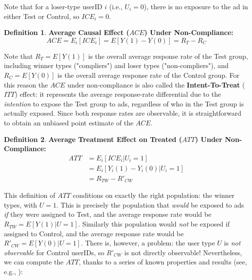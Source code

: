 \documentclass[11pt,a4paper]{article}
\theoremstyle{definition}
\newtheorem{definition}{Definition}[section]
\theoremstyle{remark}
\theoremstyle{definition}
\theoremstyle{definition}
\theoremstyle{definition}
\theoremstyle{definition}
\theoremstyle{definition}
\theoremstyle{definition}
\begin{document}
Note that for a loser-type userID $i$ (i.e., $U_i = 0$), there is no exposure to the ad in either Test or Control, so $ICE_i = 0$.

\begin{definition}\label{def-ace-noncomp}\small
	\textbf{Average Causal Effect ($ACE$) Under Non-Compliance:}
\begin{equation}
ACE = E_i[ICE_i] = E[ Y(1) - Y(0) ] = R_T - R_C \label{eq-ace-noncomp}	
\end{equation}
\end{definition}

Note that $R_T = E[ Y(1)]$ is the overall average response rate of the Test group, including winner types ("compliers") and loser types ("non-compliers"), and $R_C = E[Y(0)]$ is the overall average response rate of the Control group. For this reason the $ACE$ under non-compliance is also called the \textbf{Intent-To-Treat} ($ITT$) effect: it represents the average response-rate differential due to the \textit{intention} to expose the Test group to ads, regardless of who in the Test group is actually exposed. Since both response rates are observable, it is straightforward to obtain an unbiased point estimate of the $ACE$.

\begin{definition}\label{def-att-noncomp}\small
	\textbf{Average Treatment Effect on Treated ($ATT$) Under Non-Compliance:}
\begin{align}
ATT & =  E_i[ ICE_i | U_i = 1]   \nonumber \\
    & =  E_i [Y_i(1) - Y_i(0) | U_i = 1] 	\nonumber \\
	& =  R_{TW} - R'_{CW}  \label{eq-att-noncomp}	
\end{align}

\end{definition}

This definition of $ATT$ conditions on exactly the right population: the winner types, with $U=1$. This is precisely the population that \textit{would} be exposed to ads \textit{if} they were assigned to Test, and the average response rate would be $R_{TW} = E[Y(1)| U=1]$. Similarly this population would \textit{not} be exposed if assigned to Control, and the average response rate would be $R'_{CW} = E[Y(0)|U=1]$. There is, however, a problem: the user type $U$ is \textit{not observable} for Control userIDs, so $R'_{CW}$ is not directly observable! Nevertheless, we can compute the $ATT$, thanks to a series of known properties and results (see, e.g., \cite{Little_Causal_2000}):
\end{document}
